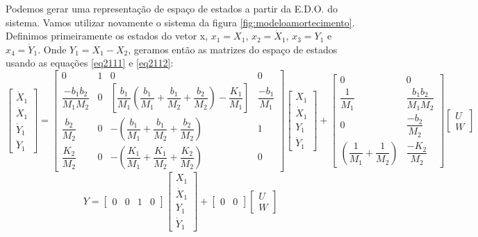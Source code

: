 Podemos gerar uma representação de espaço de estados a partir da E.D.O. do sistema. Vamos utilizar novamente o sistema da figura \ref{fig:modeloamortecimento}. Definimos primeiramente os estados do vetor x, $x_1=X_1$, $x_2=\dot{X}_1$, $x_3=Y_1$ e $x_4=\dot{Y}_1$. Onde $Y_1=X_1-X_2$, geramos então as matrizes do espaço de estados usando as equações \ref{eq2111} e \ref{eq2112}:
\begin{equation}
\begin{bmatrix}
\dot{X}_1\\
\ddot{X}_1\\
\dot{Y}_1\\
\ddot{Y}_1
\end{bmatrix}
=
\begin{bmatrix}
0 & 1 & 0 & 0\\
\dfrac{-b_1b_2}{M_1M_2} & 0 &\left[ \dfrac {b_1} {M_1} \left( \dfrac {b_1} {M_1} + \dfrac{b_1}{M_2} +\dfrac{b_2}{M_2} \right)- \dfrac{K_1}{M_1}\right] & \dfrac{-b_1}{M_1}\\
\dfrac{b_2}{M_2} & 0 & -\left( \dfrac{b_1}{M_1}+ \dfrac{b_1}{M_2}+ \dfrac{b_2}{M_2} \right) & 1\\
\dfrac{K_2}{M_2} & 0 & -\left( \dfrac{K_1}{M_1} +\dfrac{K_1}{M_2}+ \dfrac{K_2}{M_2} \right) & 0
\end{bmatrix}
\begin{bmatrix}
X_1\\\dot{X}_1 \\Y_1 \\ \dot{Y}_1
\end{bmatrix}
+
\begin{bmatrix}
0 & 0 \\
\dfrac{1}{M_1} & \dfrac{b_1b_2}{M_1M_2}\\
0 & \dfrac{-b_2}{M_2} \\
\left( \dfrac{1}{M_1}+ \dfrac{1}{M_2} \right) & \dfrac{-K_2}{M_2}
\end{bmatrix}
\begin{bmatrix}
U\\W
\end{bmatrix}
\end{equation}
\begin{equation}
Y=
\begin{bmatrix}
0 & 0 & 1 & 0
\end{bmatrix}
\begin{bmatrix}
X_1\\\dot{X}_1\\Y_1\\\dot{Y}_1
\end{bmatrix}
+
\begin{bmatrix}
0 & 0
\end{bmatrix}
\begin{bmatrix}
U \\W
\end{bmatrix}
\end{equation}

